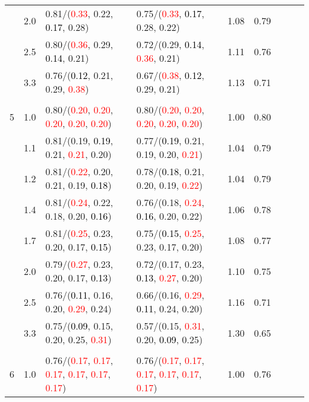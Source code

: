 \documentclass[10pt,a4paper]{report}
\begin{document}
\begin{table}[!htbp]
\begin{center}
{\begin{tabular}{ccllccccc}
			&2.0&0.81/(\textcolor{red}{0.33}, 0.22, \textcolor{black}{0.17}, 0.28)&0.75/(\textcolor{red}{0.33}, \textcolor{black}{0.17}, 0.28, 0.22)&1.08&0.79\\
			&2.5&0.80/(\textcolor{red}{0.36}, 0.29, \textcolor{black}{0.14}, 0.21)&0.72/(0.29, \textcolor{black}{0.14}, \textcolor{red}{0.36}, 0.21)&1.11&0.76\\
			&3.3&0.76/(\textcolor{black}{0.12}, 0.21, 0.29, \textcolor{red}{0.38})&0.67/(\textcolor{red}{0.38}, \textcolor{black}{0.12}, 0.29, 0.21)&1.13&0.71\\
			&&&&\\
			5			&1.0&0.80/(\textcolor{red}{0.20}, \textcolor{red}{0.20}, \textcolor{red}{0.20}, \textcolor{red}{0.20}, \textcolor{red}{0.20})&0.80/(\textcolor{red}{0.20}, \textcolor{red}{0.20}, \textcolor{red}{0.20}, \textcolor{red}{0.20}, \textcolor{red}{0.20})&1.00&0.80\\
			&1.1&0.81/(0.19, \textcolor{black}{0.19}, 0.21, \textcolor{red}{0.21}, 0.20)&0.77/(\textcolor{black}{0.19}, 0.21, 0.19, 0.20, \textcolor{red}{0.21})&1.04&0.79\\
			&1.2&0.81/(\textcolor{red}{0.22}, 0.20, 0.21, 0.19, \textcolor{black}{0.18})&0.78/(\textcolor{black}{0.18}, 0.21, 0.20, 0.19, \textcolor{red}{0.22})&1.04&0.79\\
			&1.4&0.81/(\textcolor{red}{0.24}, 0.22, 0.18, 0.20, \textcolor{black}{0.16})&0.76/(0.18, \textcolor{red}{0.24}, \textcolor{black}{0.16}, 0.20, 0.22)&1.06&0.78\\
			&1.7&0.81/(\textcolor{red}{0.25}, 0.23, 0.20, 0.17, \textcolor{black}{0.15})&0.75/(\textcolor{black}{0.15}, \textcolor{red}{0.25}, 0.23, 0.17, 0.20)&1.08&0.77\\
			&2.0&0.79/(\textcolor{red}{0.27}, 0.23, 0.20, 0.17, \textcolor{black}{0.13})&0.72/(0.17, 0.23, \textcolor{black}{0.13}, \textcolor{red}{0.27}, 0.20)&1.10&0.75\\
			&2.5&0.76/(\textcolor{black}{0.11}, 0.16, 0.20, \textcolor{red}{0.29}, 0.24)&0.66/(0.16, \textcolor{red}{0.29}, \textcolor{black}{0.11}, 0.24, 0.20)&1.16&0.71\\
			&3.3&0.75/(\textcolor{black}{0.09}, 0.15, 0.20, 0.25, \textcolor{red}{0.31})&0.57/(0.15, \textcolor{red}{0.31}, 0.20, \textcolor{black}{0.09}, 0.25)&1.30&0.65\\
			&&&&\\
			6			&1.0&0.76/(\textcolor{red}{0.17}, \textcolor{red}{0.17}, \textcolor{red}{0.17}, \textcolor{red}{0.17}, \textcolor{red}{0.17}, \textcolor{red}{0.17})&0.76/(\textcolor{red}{0.17}, \textcolor{red}{0.17}, \textcolor{red}{0.17}, \textcolor{red}{0.17}, \textcolor{red}{0.17}, \textcolor{red}{0.17})&1.00&0.76\\

\end{tabular}}
\end{center}
\end{table}
\end{document}
